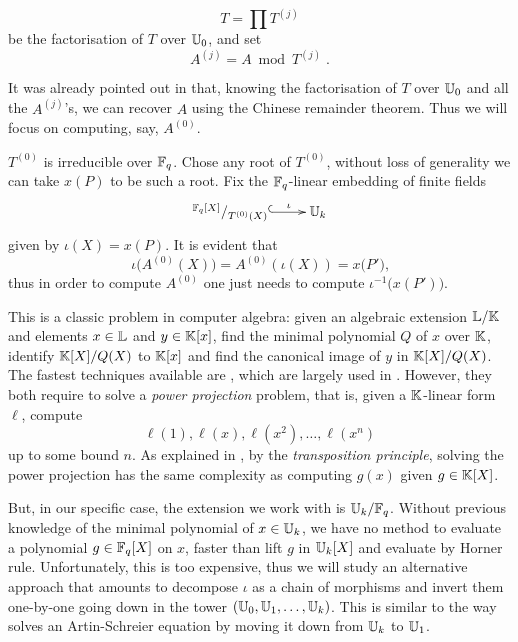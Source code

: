 \begin{equation}
  \label{eq:T}
  T = \prod T^{(j)}
\end{equation}
be the factorisation of $T$ over $\mathbb{U}_0$, and set
\begin{equation}
  \label{eq:A}
  A^{(j)} = A \bmod T^{(j)}
  \;\text{.}
\end{equation}

It was already pointed out in \cite[$\S$2.3]{Cou96} that, knowing the
factorisation of $T$ over $\mathbb{U}_0$ and all the $A^{(j)}$'s, we can
recover $A$ using the Chinese remainder theorem. Thus we will focus on
computing, say, $A^{(0)}$.

$T^{(0)}$ is irreducible over $\mathbb{F}_q$. Chose any root of $T^{(0)}$,
without loss of generality we can take $x(P)$ to be such a root.  Fix
the $\mathbb{F}_q$-linear embedding of finite fields
\begin{equation}
  \label{eq:embed}
  \xymatrix{
    ^{\F_q[X]}/_{T^{(0)}(X)} \ar@{^{(}->}[r]^-\iota & \U_k
  }
\end{equation}
given by $\iota(X) = x(P)$. It is evident that
\begin{equation}
  \iota\bigl(A^{(0)}(X)\bigr) = A^{(0)}\left(\iota(X)\right)=x\bigl(P'\bigr)
  \text{,}
\end{equation}
thus in order to compute $A^{(0)}$ one just needs to compute
$\iota^{-1}\bigl(x(P')\bigr)$.

This is a classic problem in computer algebra: given an algebraic
extension $\mathbb{L}/\mathbb{K}$ and elements $x\in\mathbb{L}$ and $y\in\mathbb{K}[x]$, find the
minimal polynomial $Q$ of $x$ over $\mathbb{K}$, identify $\mathbb{K}[X]/Q(X)$ to
$\mathbb{K}[x]$ and find the canonical image of $y$ in $\mathbb{K}[X]/Q(X)$. The
fastest techniques available are \cite{Shoup99,PS06}, which are largely
used in \cite{DFS09}. However, they both require to solve a
\emph{power projection} problem, that is, given a $\mathbb{K}$-linear form
$\ell$, compute
\begin{equation}
  \ell(1), \ell(x), \ell(x^2), \dots, \ell(x^n)
\end{equation}
up to some bound $n$. As explained in \cite{Shoup99}, by the
\emph{transposition principle}, solving the power projection has the
same complexity as computing $g(x)$ given $g\in\mathbb{K}[X]$.

But, in our specific case, the extension we work with is $\mathbb{U}_k/\mathbb{F}_q$.
Without previous knowledge of the minimal polynomial of $x\in\mathbb{U}_k$, we
have no method to evaluate a polynomial $g\in\mathbb{F}_q[X]$ on $x$, faster
than lift $g$ in $\mathbb{U}_k[X]$ and evaluate by Horner rule. Unfortunately,
this is too expensive, thus we will study an alternative approach that
amounts to decompose $\iota$ as a chain of morphisms and invert them
one-by-one going down in the tower $(\mathbb{U}_0,\mathbb{U}_1,\ldots,\mathbb{U}_k)$. This is
similar to the way \cite{Cou00} solves an Artin-Schreier equation by
moving it down from $\mathbb{U}_k$ to $\mathbb{U}_1$.


